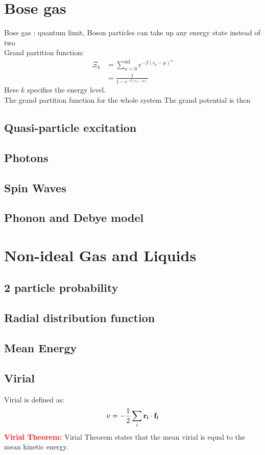 \documentclass[10pt,a4paper]{article}
\newcommand{\theorem}[2]{\textbf{\textcolor{red}{#1: }}{#2}\\}
\begin{document}
\section{Bose gas}
    Bose gas : quantum limit, Boson particles can take up any energy state instead of two\\
    Grand partition function:
    \begin{align*}
    \Xi_k   &= \sum_{n=0}^{\inf} e^{-\beta(\epsilon_k-\mu)^n}\\
            &=\frac{1}{1-e^{-\beta(\epsilon_k-\mu)}}
    \end{align*}
    Here $k$ specifies the energy level.\\
    The grand partition function for the whole system
    The grand potential is then
\subsection{Quasi-particle excitation}
\subsection{Photons}
\subsection{Spin Waves}
\subsection{Phonon and Debye model}
\section{Non-ideal Gas and Liquids}
\subsection{2 particle probability}
\subsection{Radial distribution function}

\subsection{Mean Energy}
\subsection{Virial}
Virial is defined as: 
\begin{align*}
    \nu = -\dfrac{1}{2} \sum_i {\vb{r_i}\cdot \vb{f_i}}
\end{align*}
\theorem{Virial Theorem}{Virial Theorem states that the mean virial is equal to the mean kinetic energy.}
\end{document}
